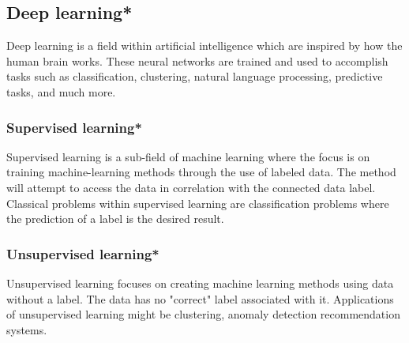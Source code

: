 \subsection{Deep learning*}

Deep learning is a field within artificial intelligence which are inspired by how the human brain works.
These neural networks are trained and used to accomplish tasks such as classification, clustering, natural language processing, predictive tasks, and much more.

\subsubsection{Supervised learning*}
Supervised learning is a sub-field of machine learning where the focus is on training
machine-learning methods through the use of labeled data.
The method will attempt to access the data in correlation with the connected data label.
Classical problems within supervised learning are classification problems where the prediction of a label is the desired result.

\subsubsection{Unsupervised learning*}
Unsupervised learning focuses on creating machine learning methods using data without a label.
The data has no "correct" label associated with it.
Applications of unsupervised learning might be clustering, anomaly detection recommendation systems.

